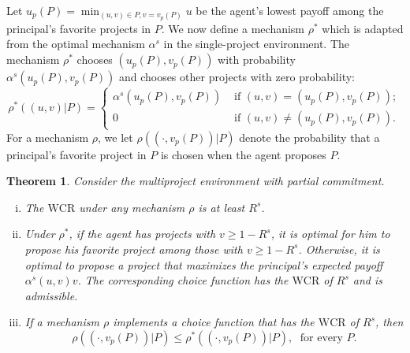 \documentclass[12pt,english]{article}
\theoremstyle{remark}
\theoremstyle{plain}
\newtheorem{theorem}{Theorem}[section]
\theoremstyle{definition}
\newcommand{\wcr}{\mathrm{WCR}}
\begin{document}
Let $u_p(P)=\min_{(u,v) \in P, v=v_p(P)} u$ be the agent's lowest payoff among the principal's favorite projects in $P$. We now define a mechanism $\rho^\ast$ which is adapted from the optimal mechanism $\alpha^s$ in the single-project environment. The mechanism $\rho^\ast$ chooses $(u_p(P),v_p(P))$ with probability $\alpha^s(u_p(P),v_p(P))$ and chooses other projects with zero probability:  
$$
\rho^\ast((u,v)|P) = \begin{cases}
 \alpha^s(u_p(P),v_p(P)) & \text{ if } (u,v) = (u_p(P),v_p(P)) ; \\
   0 & \text{ if } (u,v) \neq (u_p(P),v_p(P)) . 	
 \end{cases}
$$
For a mechanism $\rho$, we let $\rho((\cdot,v_p(P))|P)$ denote the probability that a principal's favorite project in $P$ is chosen when the agent proposes $P$.  
\begin{theorem}\label{thm:partial} Consider the multiproject environment with partial commitment.
\begin{enumerate}[(i)]
\vspace{-0.35cm} \item The $\wcr$ under any mechanism $\rho$ is at least $R^s$. 
\vspace{-0.35cm} \item Under $\rho^\ast$, if the agent has projects with $v\geqslant 1-R^s$, it is optimal for him to propose his favorite project among those with $v\geqslant 1-R^s$. Otherwise, it is optimal to propose a project that maximizes the principal's expected payoff $\alpha^s(u,v)v$. The corresponding choice function has the $\wcr$ of $R^s$ and is admissible. 
\vspace{-0.35cm} \item \label{singlethree} If a mechanism $\rho$ implements a choice function that has the $\wcr$ of $R^s$, then 
$$
\rho((\cdot,v_p(P))|P) \leqslant \rho^\ast((\cdot,v_p(P))|P), \; \text{ for every } P . $$ 
\end{enumerate}	
\end{theorem}
\end{document}
